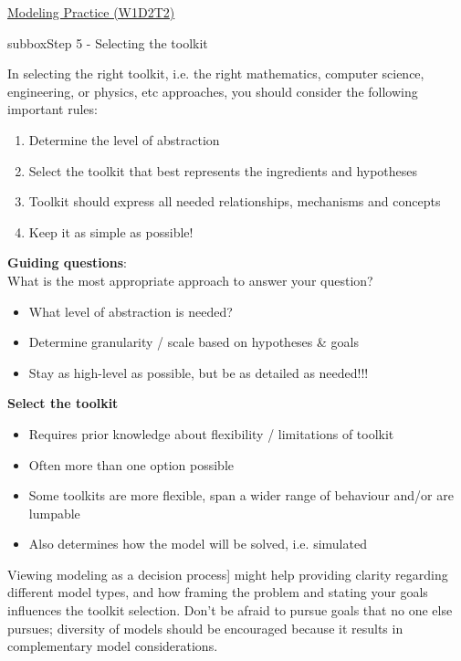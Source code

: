 \begin{textbox}{\href{https://compneuro.neuromatch.io/tutorials/W1D2_ModelingPractice/W1D2_Intro.html}{Modeling Practice  (W1D2T2)} }

\begin{subbox}{subbox}{Step 5 - Selecting the toolkit}
\scriptsize

In selecting the right toolkit, i.e. the right mathematics, computer science, engineering, or physics, etc approaches, you should consider the following important rules:
\begin{enumerate}
    \item 
 Determine the level of abstraction
 \item  Select the toolkit that best represents the ingredients and hypotheses
 \item  Toolkit should express all needed relationships, mechanisms and concepts
 \item  Keep it as simple as possible!
\end{enumerate}

\textbf{Guiding questions}:\\
What is the most appropriate approach to answer your question?
\begin{itemize}

  \item  What level of abstraction is needed?
  \item  Determine granularity / scale based on hypotheses \& goals
  \item  Stay as high-level as possible, but be as detailed as needed!!!
  \end{itemize}

\textbf{Select the toolkit}
 \begin{itemize}
    \item  Requires prior knowledge about flexibility / limitations of toolkit
  \item  Often more than one option possible
  \item  Some toolkits are more flexible, span a wider range of behaviour and/or are lumpable
 \item  Also determines how the model will be solved, i.e. simulated
 
 \end{itemize}

Viewing modeling as a decision process] might help providing clarity regarding different model types, and how framing the problem and stating your goals influences the toolkit selection. Don't be afraid to pursue goals that no one else pursues; diversity of models should be encouraged because it results in complementary model considerations. 


\end{subbox}
\end{textbox}

